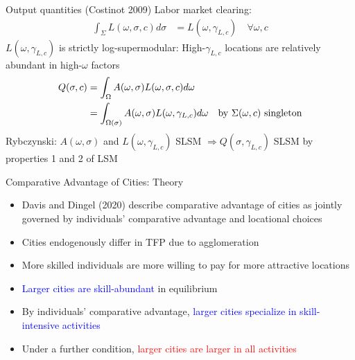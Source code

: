 \documentclass[10pt,notes=hide]{beamer}
\begin{document}
\begin{frame}{Output quantities (Costinot 2009)}
Labor market clearing:
\begin{align*}
\int_{\Sigma} L(\omega,\sigma,c)d\sigma &= L(\omega,\gamma_{L,c}) \quad \forall \omega,c
\end{align*}
$L(\omega,\gamma_{L,c})$ is strictly log-supermodular: High-$\gamma_{L,c}$ locations are relatively abundant in high-$\omega$ factors
		\begin{align*}
		Q(\sigma,c) & = \int_{\Omega} A(\omega,\sigma)L(\omega,\sigma,c)d\omega \\
		 & = \int_{\Omega(\sigma)} A(\omega,\sigma)L(\omega,\gamma_{L,c})d\omega &\textnormal{by $\Sigma(\omega,c)$ singleton}
		\end{align*}
Rybczynski: $A(\omega,\sigma)$ and $L(\omega,\gamma_{L,c})$ SLSM $\Rightarrow Q(\sigma,\gamma_{L,c})$ SLSM by properties 1 and 2 of LSM
\end{frame}
\begin{frame}{Comparative Advantage of Cities: Theory}
\begin{itemize}
\item Davis and Dingel (2020) describe comparative advantage of cities as jointly governed by
individuals' comparative advantage and locational choices
\item Cities endogenously differ in TFP due to agglomeration
\item More skilled individuals are more willing to pay for more attractive
locations
\item \textcolor{blue}{Larger cities are skill-abundant} in equilibrium
\item By individuals' comparative advantage, \textcolor{blue}{larger cities
specialize in skill-intensive activities}
\item Under a further condition, \textcolor{red}{larger cities are larger
in all activities}
\end{itemize}
\end{frame}
\end{document}

